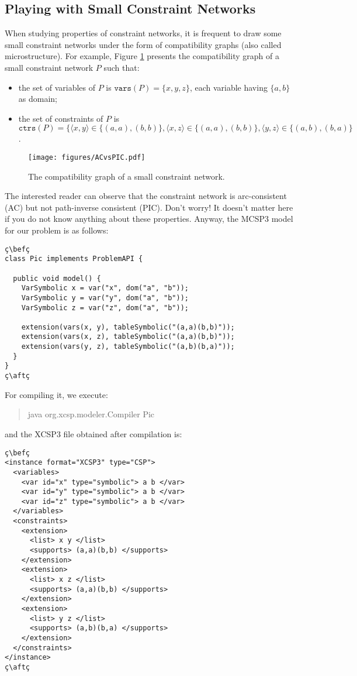\documentclass[10pt]{article}
\def\xt{{\rm XCSP3}\xspace}
\def\mt{{\rm MCSP3}\xspace}
\def\xt{{\rm XCSP3}\xspace}
\newenvironment{myvb}{\endgraf\small\verbatim}{\endverbatim}
\def\bef{\rule{10cm}{0.1mm}} %
\def\aft{\rule{10cm}{0.1mm}\medskip}
\newcommand{\f}[1]{\mathtt{#1}} %
\begin{document}
\subsection{Playing with Small Constraint Networks}

When studying properties of constraint networks, it is frequent to draw some small constraint networks under the form of compatibility graphs (also called microstructure).
For example, Figure \ref{fig:small} presents the compatibility graph of a small constraint network $P$ such that:
\begin{itemize}
\item the set of variables of $P$ is $\f{vars}(P)=\{x,y,z\}$, each variable having $\{a,b\}$ as domain;
  \item the set of constraints of $P$ is $\f{ctrs}(P)= \{\langle x,y \rangle \in \{(a,a),(b,b)\}, \langle x,z \rangle \in \{(a,a),(b,b)\},\langle y,z \rangle \in \{(a,b),(b,a)\}$.
\end{itemize}

\begin{figure}[h!]
\begin{center}
  \texttt{[image: figures/ACvsPIC.pdf]}
\end{center}
\caption{The compatibility graph of a small constraint network.\label{fig:small}}
\end{figure}

The interested reader can observe that the constraint network is arc-consistent (AC) but not path-inverse consistent (PIC).
Don't worry! It doesn't matter here if you do not know anything about these properties. 
Anyway, the \mt model for our problem is as follows:


\begin{lstlisting}
ç\befç
class Pic implements ProblemAPI {
  
  public void model() {
    VarSymbolic x = var("x", dom("a", "b"));
    VarSymbolic y = var("y", dom("a", "b"));
    VarSymbolic z = var("z", dom("a", "b"));
    
    extension(vars(x, y), tableSymbolic("(a,a)(b,b)"));
    extension(vars(x, z), tableSymbolic("(a,a)(b,b)"));
    extension(vars(y, z), tableSymbolic("(a,b)(b,a)"));
  }
}
ç\aftç
\end{lstlisting}
For compiling it, we execute:
\begin{quote}
\begin{myvb}
java org.xcsp.modeler.Compiler Pic
\end{myvb}
\end{quote}
and the \xt file obtained after compilation is:
\begin{lstlisting}
ç\befç
<instance format="XCSP3" type="CSP">
  <variables>
    <var id="x" type="symbolic"> a b </var>
    <var id="y" type="symbolic"> a b </var>
    <var id="z" type="symbolic"> a b </var>
  </variables>
  <constraints>
    <extension>
      <list> x y </list>
      <supports> (a,a)(b,b) </supports>
    </extension>
    <extension>
      <list> x z </list>
      <supports> (a,a)(b,b) </supports>
    </extension>
    <extension>
      <list> y z </list>
      <supports> (a,b)(b,a) </supports>
    </extension>
  </constraints>
</instance>
ç\aftç
\end{lstlisting}
\end{document}
